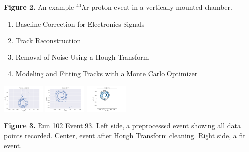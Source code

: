 \documentclass[a0paper,portrait]{baposter}
\begin{document}
\begin{poster}
{{\textbf{Figure 2.} An example $^{40}$Ar proton event in a vertically mounted chamber.

\begin{enumerate}
\item Baseline Correction for Electronics Signals
\item Track Reconstruction
\item Removal of Noise Using a Hough Transform
\item Modeling and Fitting Tracks with a Monte Carlo Optimizer
\end{enumerate}

\begin{center}
\includegraphics [width=21mm] {preprocess_evt.pdf}
\hspace{.3cm}
\includegraphics [width=21mm] {clean_evt.pdf}
\hspace{.3cm}
\includegraphics [width=21mm] {fit_evt.pdf}
\end{center}

\textbf{Figure 3.} Run 102 Event 93. Left side, a preprocessed event showing all data points recorded. Center, event after Hough Transform cleaning. Right side, a fit event.}

} 

\end{poster}
\end{document}
